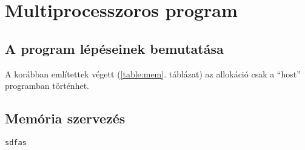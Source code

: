 \chapter{Multiprocesszoros program}
\section{A program lépéseinek bemutatása}

	A korábban említettek végett (\ref{table:mem}. táblázat)
	az allokáció csak a ``host'' programban történhet.

\section{Memória szervezés}
\begin{lstlisting}[frame=single,float=!ht,caption=A detektálás kernelének kódja,
label=listing:kernel]
sdfas
\end{lstlisting}